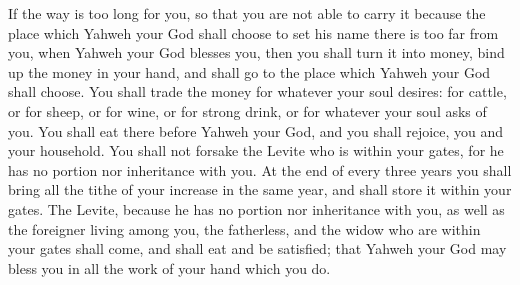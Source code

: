{If the way is too long for you, so that you are not able to carry it because the place which Yahweh your God shall choose to set his name there is too far from you, when Yahweh your God blesses you,
then you shall turn it into money, bind up the money in your hand, and shall go to the place which Yahweh your God shall choose.
You shall trade the money for whatever your soul desires: for cattle, or for sheep, or for wine, or for strong drink, or for whatever your soul asks of you. You shall eat there before Yahweh your God, and you shall rejoice, you and your household.
You shall not forsake the Levite who is within your gates, for he has no portion nor inheritance with you.
At the end of every three years you shall bring all the tithe of your increase in the same year, and shall store it within your gates.
The Levite, because he has no portion nor inheritance with you, as well as the foreigner living among you, the fatherless, and the widow who are within your gates shall come, and shall eat and be satisfied; that Yahweh your God may bless you in all the work of your hand which you do.

}
